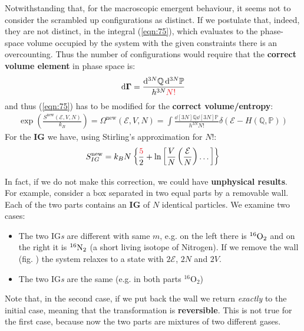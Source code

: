 \documentclass[../template.tex]{subfiles}
\begin{document}
Notwithstanding that, for the macroscopic emergent behaviour, it seems  not to consider the scrambled up configurations as distinct. If we postulate that, indeed, they are not distinct, in the integral (\ref{eqn:75}), which evaluates to the phase-space volume occupied by the system with the given constraints there is an overcounting. Thus the number of  configurations would require that the \textbf{correct volume element} in phase space is:
\begin{align}
    \label{eqn:76}
    \dd{\bm{\Gamma}} = \frac{\dd[3N]{\mathbb{Q}} \dd[3N]{\mathbb{P}}}{h^{3N} \textcolor{Red}{N!}} 
\end{align} 
and thus (\ref{eqn:75}) has to be modified for the \textbf{correct volume/entropy}:
\begin{align}\label{eqn:77}
    \exp(\frac{S^{\mathrm{new} }(\mathcal{E}, V, N)}{k_B} ) = \Omega^{\mathrm{new}}(\mathcal{E}, V, N) = \int \frac{\dd[3N]{\mathbb{Q}} \dd[3N]{\mathbb{P}}}{h^{3N}N!} \delta(\mathcal{E}-H(\mathbb{Q}, \mathbb{P})) 
\end{align} 
For the \textbf{IG} we have, using Stirling's approximation for $N!$:
\begin{align}
    S_{IG}^{\mathrm{new}} = k_B N \left\{\frac{\textcolor{Red}{5}}{2} + \ln \left[\frac{V}{N} \left(\frac{\mathcal{E}}{N} \right) \dots \right]\right\} \label{eqn:79}
\end{align} 

In fact, if we do not make this correction, we could have \textbf{unphysical results}. For example, consider a box separated in two equal parts by a removable wall. Each of the two parts contains an \textbf{IG} of $N$ identical particles. We examine two cases:
\begin{itemize}
    \item The two IG\textit{s} are different with same $m$, e.g. on the left there is $^{16}\rm{O}_2$ and on the right it is $^{16}{\rm{N}}_2$ (a short living isotope of Nitrogen). If we remove the wall (fig. )%
    the system relaxes to a state with $2 \mathcal{E}$, $2N$ and $2V$.
    \item The two IG\textit{s} are the same (e.g. in both parts $^{16}{\mathrm{O}}_2$) 
\end{itemize}
Note that, in the second case, if we put back the wall we return \textit{exactly} to the initial case, meaning that the transformation is \textbf{reversible}. This is not true for the first case, because now the two parts are mixtures of two different gases. 
\end{document}
